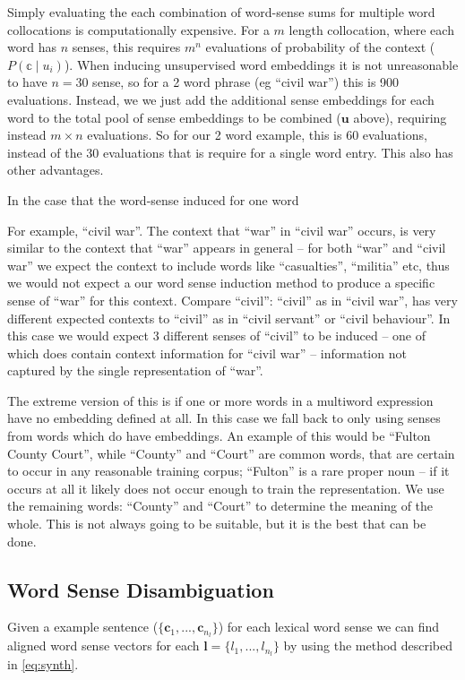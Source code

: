\documentclass{sig-alternate}
\renewcommand{\c}{\mathbf{c}}
\renewcommand{\l}{\mathbf{l}}
\renewcommand{\u}{\mathbf{u}}
\begin{document}
Simply evaluating the each combination of word-sense sums for multiple word collocations is computationally expensive. For a $m$ length collocation, where each word has $n$ senses, this requires $m^n$ evaluations of probability of the context ($P(\mathbb{c}\mid u_i)$). When inducing unsupervised word embeddings it is not unreasonable to have $n=30$ sense, so for a 2 word phrase (eg ``civil war'') this is 900 evaluations.
Instead, we we just add the additional sense embeddings for each word to the total pool of sense embeddings to be combined ($\u$ above), requiring instead $m \times n$ evaluations. So for our 2 word example, this is 60 evaluations, instead of the 30 evaluations that is require for a single word entry. This also has other advantages.


In the case that the word-sense induced for one word 

For example, ``civil war''. The context that ``war'' in ``civil war'' occurs, is very similar to the context that ``war'' appears in general -- for both ``war'' and ``civil war'' we expect the context to include words like ``casualties'', ``militia'' etc, thus we would not expect a our word sense induction method to produce a specific sense of ``war'' for this context.
Compare ``civil'': ``civil'' as in ``civil war'', has very different expected contexts to ``civil'' as in ``civil servant'' or ``civil behaviour''. In this case we would expect 3 different senses of ``civil'' to be induced -- one of which does contain context information for ``civil war'' -- information not captured by the single representation of ``war''.

The extreme version of this is if one or more words in a multiword expression have no embedding defined at all. In this case we fall back to only using senses from words which do have embeddings. An example of this would be ``Fulton County Court'', while ``County'' and ``Court'' are common words, that are certain to occur in any reasonable training corpus; ``Fulton'' is a rare proper noun -- if it occurs at all it likely does not occur enough to train the representation. We use the remaining words: ``County'' and ``Court'' to determine the meaning of the whole. This is not always going to be suitable, but it is the best that can be done.


\subsection{Word Sense Disambiguation}
Given a example sentence ($\{\c_1,...,\c_{n_l}\}$) for each lexical word sense we can find aligned word sense vectors for each $\l=\{l_1,..., l_{n_l}\}$ by using the method described in \cref{eq:synth}. 
\end{document}
